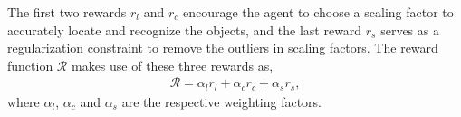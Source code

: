 \documentclass[letterpaper]{article} %
\newcommand\rjf[1]{\textcolor{red}{\{RJF: #1\}}}
\newcommand\yxy[1]{\textcolor{blue}{\{YXY: #1\}}}
\begin{document}


The first two rewards $r_l$ and $r_c$ encourage the agent to choose a scaling factor to accurately locate and recognize the objects, and the last reward $r_s$ serves as a regularization constraint to remove the outliers in scaling factors. The reward function $\mathcal{R}$ makes use of these three rewards as,
\begin{align}
\label{equ:rewardFunction}
\mathcal{R} = \alpha_l r_l +\alpha_c r_c + \alpha_s r_s,
\end{align}
where $\alpha_l$, $\alpha_c$ and $\alpha_s$ are the respective weighting factors. %
\end{document}
